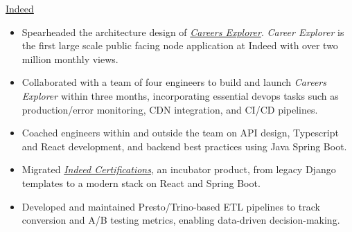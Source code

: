 \documentclass[]{cv} %
\begin{document}
\entry
{\href{https://www.indeed.com/}{Indeed}}
{
\begin{itemize}
\item Spearheaded the architecture design of \href{https://www.indeed.com/career}{\emph{Careers Explorer}}. \emph{Career Explorer} is the first large scale public facing node application at Indeed with over two million monthly views.
\item Collaborated with a team of four engineers to build and launch \emph{Careers Explorer} within three months, incorporating essential devops tasks such as production/error monitoring, CDN integration, and CI/CD pipelines.
\item Coached engineers within and outside the team on API design, Typescript and React development, and backend best practices using Java Spring Boot.
\item Migrated \href{https://www.indeed.com/certifications/}{\emph{Indeed Certifications}}, an incubator product, from legacy Django templates to a modern stack on React and Spring Boot.
\item Developed and maintained Presto/Trino-based ETL pipelines to track conversion and A/B testing metrics, enabling data-driven decision-making.
\end{itemize}
}

\end{document}
